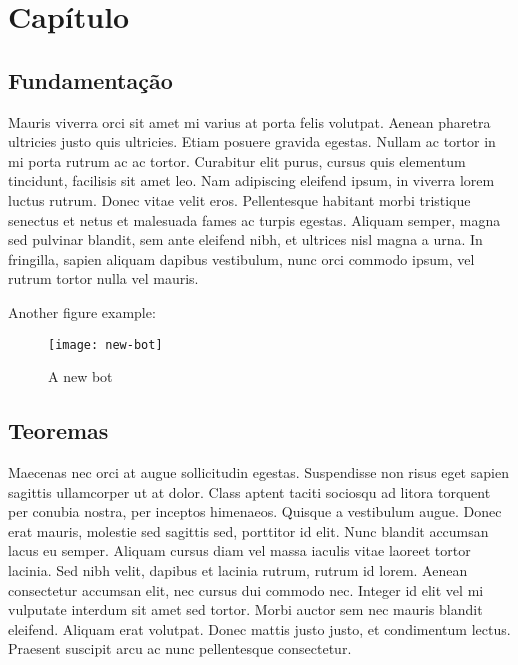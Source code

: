 
\chapter{Capítulo}


\section{Fundamentação }

Mauris viverra orci sit amet \citeauthor{article:dummy} mi varius at porta
felis volutpat. Aenean pharetra ultricies justo quis ultricies. Etiam
posuere gravida egestas. Nullam ac tortor in mi porta rutrum ac ac
tortor. Curabitur elit purus, cursus quis elementum tincidunt, facilisis
sit amet leo. Nam adipiscing eleifend ipsum, in viverra lorem luctus
rutrum. Donec vitae velit eros. Pellentesque habitant morbi tristique
senectus et netus et malesuada fames ac turpis egestas. Aliquam semper,
magna sed pulvinar blandit, sem ante eleifend nibh, et ultrices nisl
magna a urna. In fringilla, sapien aliquam dapibus vestibulum, nunc
orci commodo ipsum, vel rutrum tortor nulla vel mauris.

Another figure example:
\begin{figure}[H]
	\centering %
	\scriptsize %
	\texttt{[image: new-bot]}
	\caption{A new bot}
	\label{fig:new_bot}
\end{figure}

\section{Teoremas}

Maecenas nec orci at augue sollicitudin egestas. Suspendisse non risus
eget sapien sagittis ullamcorper ut at dolor. Class aptent taciti
sociosqu ad litora torquent per conubia nostra, per inceptos himenaeos.
Quisque a vestibulum augue. Donec erat mauris, molestie sed sagittis
sed, porttitor id elit. Nunc blandit accumsan lacus eu semper. Aliquam
cursus diam vel massa iaculis vitae laoreet tortor lacinia. Sed nibh
velit, dapibus et lacinia rutrum, rutrum id lorem. Aenean consectetur
accumsan elit, nec cursus dui commodo nec. Integer id elit vel mi
vulputate interdum sit amet sed tortor. Morbi auctor sem nec mauris
blandit eleifend. Aliquam erat volutpat. Donec mattis justo justo,
et condimentum lectus. Praesent suscipit arcu ac nunc pellentesque
consectetur.

